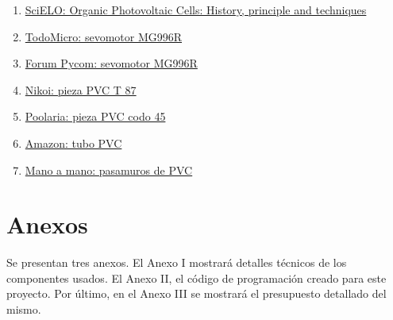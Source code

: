 \documentclass[12pt]{article}
\begin{document}
\begin{enumerate}
				\item 
				\label{bib: SciELO}
				\href{https://www.scielo.cl/scielo.php?script=sci_arttext\&pid=S0717-97072008000300001}{SciELO: Organic Photovoltaic Cells: History, principle and techniques}
				
				\item 
				\label{bib: todomicro}
				\href{https://www.todomicro.com.ar/motores-y-drivers-motores/234-servomotor-mg996r-digital-10kg-torque.html}{TodoMicro: sevomotor MG996R}
				
				\item 
				\label{bib: forum pycom}
				\href{https://forum.pycom.io/topic/982/mg996r-pwm-3v3-solved}{Forum Pycom: sevomotor MG996R}
				
				\item 
				\label{bib: Nikoi ferreteria}
				\href{https://www.nikoi.nl/es/pvc-t-stuk-87-125-mm-3-x-mof}{Nikoi: pieza PVC T 87\degree}
				
				\item 
				\label{bib: Poolaria}
				\href{https://www.poolaria.com/accesorios-de-pvc/317-codo-45-pvc-encolar.html}{Poolaria: pieza PVC codo 45\degree}
				
				
				\item 
				\label{bib: Amazon}
				\href{https://www.amazon.es/Di\%C3\%A1metro-\%C3\%A1ngulo-Rodillera-muffen-Fittings/dp/B017SXJFAM}{Amazon: tubo PVC}
				
				
				\item 
				\label{bib: mano a mano}
				\href{https://www.manomano.es/p/63-mm-21-2-pasamuros-de-pvc-para-tuberias-63-mm-27277644}{Mano a mano: pasamuros de PVC}
			\end{enumerate}

	\pagebreak
	
	\section*{Anexos}
	
	\noindent Se presentan tres anexos. El Anexo I mostrará detalles técnicos de los componentes usados. El Anexo II, el código de programación creado para este proyecto. Por último, en el Anexo III se mostrará el presupuesto detallado del mismo. \\
	
\end{document}
